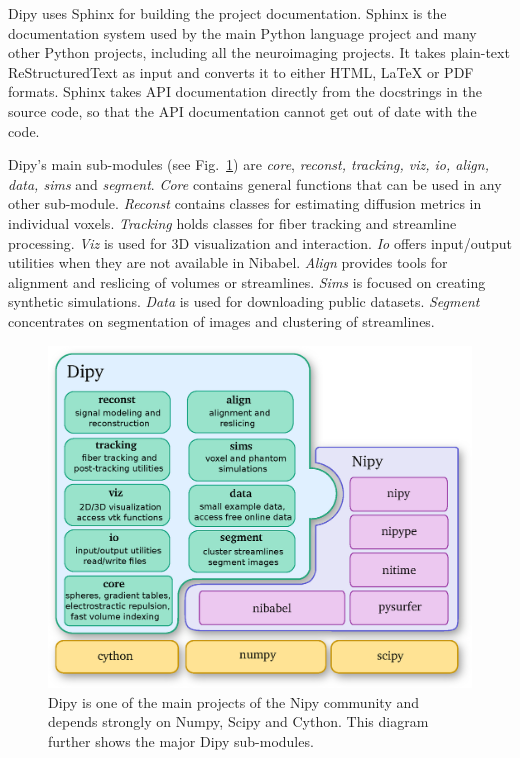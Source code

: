 \documentclass{bioinfo}
\begin{document}
Dipy uses Sphinx for building the project documentation. Sphinx is the
documentation system used by the main Python language project and many other
Python projects, including all the neuroimaging projects.  It takes plain-text
ReStructuredText as input and converts it to either HTML, LaTeX or PDF formats.
Sphinx takes API documentation directly from the docstrings in the source code,
so that the API documentation cannot get out of date with the code.

Dipy's main sub-modules (see Fig.~\ref{Fig:module_structure}) are \emph{core},
\emph{reconst, tracking, viz, io, align, data, sims} and \emph{segment}.
\emph{Core} contains general functions that can be used in any other sub-module.
\emph{Reconst} contains classes for estimating diffusion metrics in individual
voxels. \emph{Tracking} holds classes for fiber tracking and streamline
processing. \emph{Viz} is used for 3D visualization and interaction. \emph{Io}
offers input/output utilities when they are not available in Nibabel.
\emph{Align} provides tools for alignment and reslicing of volumes or
streamlines. \emph{Sims} is focused on creating synthetic simulations.
\emph{Data} is used for downloading public datasets. \emph{Segment} concentrates
on segmentation of images and clustering of streamlines.

\begin{figure}
\includegraphics[scale=0.42]{Figures/module_structure2.eps}
\centering{}
\caption{Dipy is one of the main projects of the Nipy community and depends strongly
on Numpy, Scipy and Cython. This diagram further shows the major Dipy sub-modules.\label{Fig:module_structure}}
\end{figure}
\end{document}
